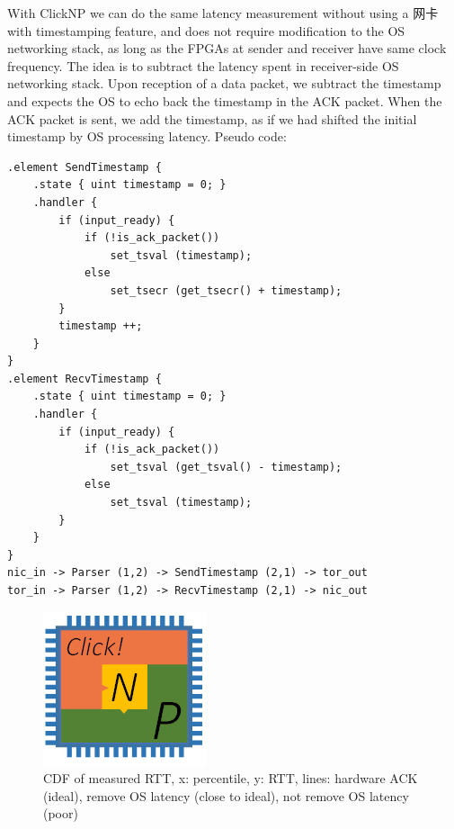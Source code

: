 {With ClickNP we can do the same latency measurement without using a 网卡 with timestamping feature, and does not require modification to the OS networking stack, as long as the FPGAs at sender and receiver have same clock frequency. The idea is to subtract the latency spent in receiver-side OS networking stack. Upon reception of a data packet, we subtract the timestamp and expects the OS to echo back the timestamp in the ACK packet. When the ACK packet is sent, we add the timestamp, as if we had shifted the initial timestamp by OS processing latency. Pseudo code:

\begin{lstlisting}
.element SendTimestamp {
    .state { uint timestamp = 0; }
    .handler {
        if (input_ready) {
            if (!is_ack_packet())
                set_tsval (timestamp);
            else
                set_tsecr (get_tsecr() + timestamp);
        }
        timestamp ++;
    }
}
.element RecvTimestamp {
    .state { uint timestamp = 0; }
    .handler {
        if (input_ready) {
            if (!is_ack_packet())
                set_tsval (get_tsval() - timestamp);
            else
                set_tsval (timestamp);
        }
    }
}
nic_in -> Parser (1,2) -> SendTimestamp (2,1) -> tor_out
tor_in -> Parser (1,2) -> RecvTimestamp (2,1) -> nic_out
\end{lstlisting}

\begin{figure}[h!]
	\centering
	\includegraphics[width=0.6\columnwidth]{image/logo}
	\vspace{-0.15in}
	\caption{CDF of measured RTT, x: percentile, y: RTT, lines: hardware ACK (ideal), remove OS latency (close to ideal), not remove OS latency (poor)}
	\vspace{-0.15in}
	\label{clicknp:fig:TimestampAccuracy}
\end{figure}
}

